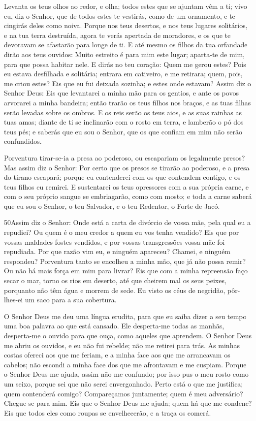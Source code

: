 Levanta os teus olhos ao redor, e olha; todos estes que se
ajuntam vêm a ti; vivo eu, diz o Senhor, que de todos estes te
vestirás, como de um ornamento, e te cingirás deles como noiva.
Porque nos teus desertos, e nos teus lugares solitários, e na
tua terra destruída, agora te verás apertada de moradores, e os que
te devoravam se afastarão para longe de ti. E até mesmo os
filhos da tua orfandade dirão aos teus ouvidos: Muito estreito é
para mim este lugar; aparta-te de mim, para que possa habitar nele.
E dirás no teu coração: Quem me gerou estes? Pois eu estava
desfilhada e solitária; entrara em cativeiro, e me retirara; quem,
pois, me criou estes? Eis que eu fui deixada sozinha; e estes onde
estavam? Assim diz o Senhor Deus: Eis que levantarei a minha
mão para os gentios, e ante os povos arvorarei a minha bandeira;
então trarão os teus filhos nos braços, e as tuas filhas serão
levadas sobre os ombros. E os reis serão os teus aios, e as
suas rainhas as tuas amas; diante de ti se inclinarão com o rosto em
terra, e lamberão o pó dos teus pés; e saberás que eu sou o Senhor,
que os que confiam em mim não serão confundidos.

Porventura tirar-se-ia a presa ao poderoso, ou escapariam os
legalmente presos? Mas assim diz o Senhor: Por certo que os
presos se tirarão ao poderoso, e a presa do tirano escapará; porque
eu contenderei com os que contendem contigo, e os teus filhos eu
remirei. E sustentarei os teus opressores com a sua própria
carne, e com o seu próprio sangue se embriagarão, como com mosto; e
toda a carne saberá que eu sou o Senhor, o teu Salvador, e o teu
Redentor, o Forte de Jacó.

\medskip

\lettrine{50}{}Assim diz o Senhor: Onde está a carta de
divórcio de vossa mãe, pela qual eu a repudiei? Ou quem é o meu
credor a quem eu vos tenha vendido? Eis que por vossas maldades
fostes vendidos, e por vossas transgressões vossa mãe foi repudiada.
Por que razão vim eu, e ninguém apareceu? Chamei, e ninguém
respondeu? Porventura tanto se encolheu a minha mão, que já não
possa remir? Ou não há mais força em mim para livrar? Eis que com a
minha repreensão faço secar o mar, torno os rios em deserto, até que
cheirem mal os seus peixes, porquanto não têm água e morrem de sede.
Eu visto os céus de negridão, pôr-lhes-ei um saco para a sua
cobertura.

O Senhor Deus me deu uma língua erudita, para que eu saiba dizer a
seu tempo uma boa palavra ao que está cansado. Ele desperta-me todas
as manhãs, desperta-me o ouvido para que ouça, como aqueles que
aprendem. O Senhor Deus me abriu os ouvidos, e eu não fui
rebelde; não me retirei para trás. As minhas costas ofereci aos
que me feriam, e a minha face aos que me arrancavam os cabelos; não
escondi a minha face dos que me afrontavam e me cuspiam. Porque
o Senhor Deus me ajuda, assim não me confundo; por isso pus o meu
rosto como um seixo, porque sei que não serei envergonhado.
Perto está o que me justifica; quem contenderá comigo?
Compareçamos juntamente; quem é meu adversário? Chegue-se para mim.
Eis que o Senhor Deus me ajuda; quem há que me condene? Eis que
todos eles como roupas se envelhecerão, e a traça os comerá.

